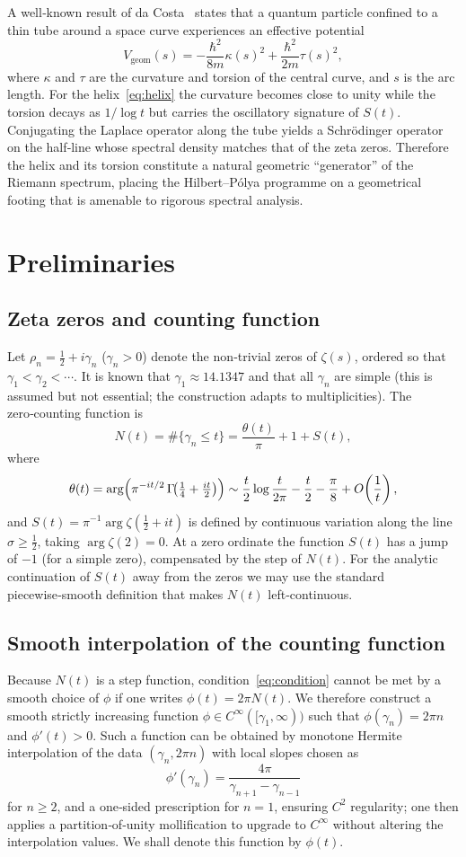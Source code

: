 \documentclass[12pt,a4paper]{article}
\begin{document}
A well‑known result of da Costa~\cite{daCosta1981} states that a quantum particle confined to a thin tube around a space curve experiences an effective potential
\[
  V_{\mathrm{geom}}(s) = -\frac{\hbar^2}{8m}\kappa(s)^2 + \frac{\hbar^2}{2m}\tau(s)^2,
\]
where $\kappa$ and $\tau$ are the curvature and torsion of the central curve, and $s$ is the arc length. For the helix~\eqref{eq:helix} the curvature becomes close to unity while the torsion decays as $1/\log t$ but carries the oscillatory signature of $S(t)$. Conjugating the Laplace operator along the tube yields a Schr\"odinger operator on the half‑line whose spectral density matches that of the zeta zeros. Therefore the helix and its torsion constitute a natural geometric ``generator'' of the Riemann spectrum, placing the Hilbert--P\'olya programme on a geometrical footing that is amenable to rigorous spectral analysis.

\section{Preliminaries}
\subsection{Zeta zeros and counting function}
Let $\rho_n = \tfrac12 + i\gamma_n$ ($\gamma_n>0$) denote the non‑trivial zeros of $\zeta(s)$, ordered so that $\gamma_1<\gamma_2<\cdots$. It is known that $\gamma_1\approx 14.1347$ and that all $\gamma_n$ are simple (this is assumed but not essential; the construction adapts to multiplicities). The zero‑counting function is
\[
  N(t)=\#\{ \gamma_n \le t\} = \frac{\theta(t)}{\pi}+1+S(t),
\]
where
\[
  \theta(t)=\arg\Bigl(\pi^{-it/2}\,\Gamma\!\bigl(\tfrac14+\tfrac{it}{2}\bigr)\Bigr)\sim\frac{t}{2}\log\frac{t}{2\pi}-\frac{t}{2}-\frac{\pi}{8}+O\!\left(\frac1t\right),
\]
and $S(t)=\pi^{-1}\arg\zeta(\tfrac12+it)$ is defined by continuous variation along the line $\sigma\ge\tfrac12$, taking $\arg\zeta(2)=0$. At a zero ordinate the function $S(t)$ has a jump of $-1$ (for a simple zero), compensated by the step of $N(t)$. For the analytic continuation of $S(t)$ away from the zeros we may use the standard piecewise‑smooth definition that makes $N(t)$ left‑continuous.

\subsection{Smooth interpolation of the counting function}
Because $N(t)$ is a step function, condition~\eqref{eq:condition} cannot be met by a smooth choice of $\phi$ if one writes $\phi(t)=2\pi N(t)$. We therefore construct a smooth strictly increasing function $\phi\in C^\infty([\gamma_1,\infty))$ such that $\phi(\gamma_n)=2\pi n$ and $\phi'(t)>0$. Such a function can be obtained by monotone Hermite interpolation of the data $(\gamma_n,2\pi n)$ with local slopes chosen as 
\[
  \phi'(\gamma_n)=\frac{4\pi}{\gamma_{n+1}-\gamma_{n-1}}
\]
for $n\ge2$, and a one‑sided prescription for $n=1$, ensuring $C^2$ regularity; one then applies a partition‑of‑unity mollification to upgrade to $C^\infty$ without altering the interpolation values. We shall denote this function by $\phi(t)$.
\end{document}
